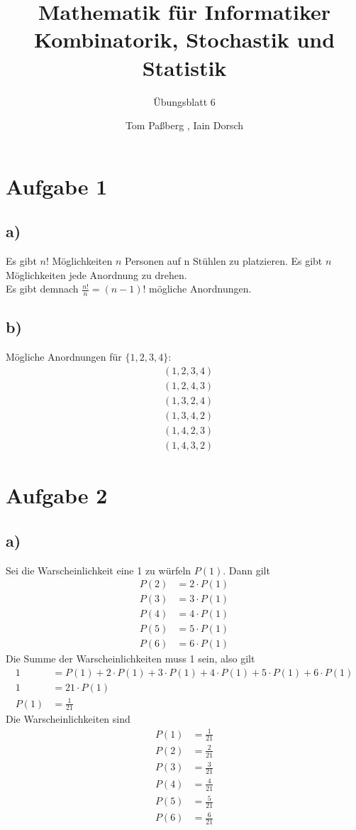 \documentclass[a4paper]{scrartcl}
\title{Mathematik für Informatiker \\ Kombinatorik, Stochastik und Statistik}
\subtitle{Übungsblatt 6}
\author{Tom Paßberg , Iain Dorsch}
\date{}
\begin{document}
\maketitle

\newpage

\section*{Aufgabe 1}
\subsection*{a)}
Es gibt $n!$ Möglichkeiten $n$ Personen auf n Stühlen zu platzieren. Es gibt $n$ Möglichkeiten jede Anordnung zu drehen. \\
Es gibt demnach $\frac{n!}{n} = (n-1)!$ mögliche Anordnungen.

\subsection*{b)}
Mögliche Anordnungen für $\{ 1,2,3,4 \}$: 
\begin{align*}
	&(1,2,3,4)\\
	&(1,2,4,3)\\
	&(1,3,2,4)\\
	&(1,3,4,2)\\
	&(1,4,2,3)\\
	&(1,4,3,2)
\end{align*}

\section*{Aufgabe 2}
\subsection*{a)}
Sei die Warscheinlichkeit eine 1 zu würfeln $ P(1)$. Dann gilt 
\begin{align*}
	P(2) &= 2 \cdot P(1) \\
	P(3) &= 3 \cdot P(1) \\
	P(4) &= 4 \cdot P(1) \\
	P(5) &= 5 \cdot P(1) \\
	P(6) &= 6 \cdot P(1) 
\end{align*}
Die Summe der Warscheinlichkeiten muss 1 sein, also gilt
\begin{align*}
	1 &= P(1) + 2 \cdot P(1) + 3 \cdot P(1) + 4 \cdot P(1) + 5 \cdot P(1) + 6 \cdot P(1) \\
	1 &= 21 \cdot P(1) \\
	P(1) &= \frac{1}{21}
\end{align*}
Die Warscheinlichkeiten sind
\begin{align*}
	P(1) &= \frac{1}{21} \\
	P(2) &= \frac{2}{21} \\
	P(3) &= \frac{3}{21} \\
	P(4) &= \frac{4}{21} \\
	P(5) &= \frac{5}{21} \\
	P(6) &= \frac{6}{21}
\end{align*}
\end{document}
